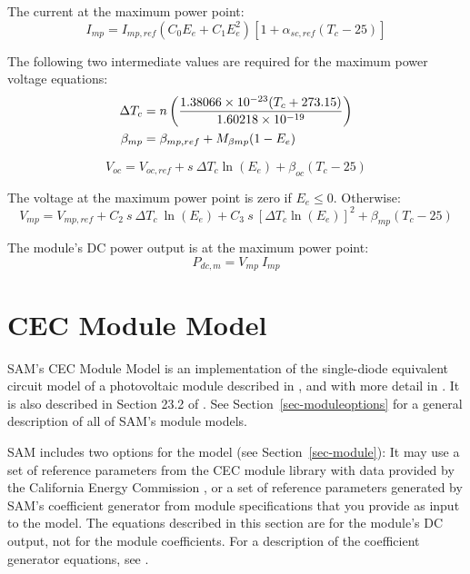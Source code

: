 \documentclass[12pt,letterpaper]{article}
\begin{document}
The current at the maximum power point:
\begin{equation}
I_{mp} = I_{mp,ref} (C_0 E_e + C_1 E_e^2) \left[1 + \alpha_{sc,ref} (T_c - 25)\right]
\end{equation}

The following two intermediate values are required for the maximum power voltage equations:
\begin{align}
\Delta T_c &= n \left(\frac{1.38066\times10^{-23} (T_c + 273.15)}{1.60218\times10^{-19}}\right) \notag\\
\beta_{mp} & = \beta_{mp,ref} + M_{\beta mp} (1 - E_e)
\end{align}

\begin{equation}
V_{oc} = V_{oc,ref}+ s~\Delta T_c \ln(E_e)+ \beta_{oc} (T_c - 25)
\end{equation}

The voltage at the maximum power point is zero if $E_e \leq 0$. Otherwise:
\begin{equation}
V_{mp} = V_{mp,ref} +
 C_2~s~\Delta T_c~\ln(E_e) +
 C_3~s~\left[\Delta T_c \ln(E_e)\right]^2 +
 \beta_{mp} (T_c - 25)
\end{equation}

The module's DC power output is at the maximum power point:
\begin{equation}
P_{dc,m} = V_{mp}~I_{mp}
\end{equation}

\section{CEC Module Model}\label{sec-cecmodule}

SAM's CEC Module Model is an implementation of the single-diode equivalent circuit model of a photovoltaic module described in \citet{desoto2004a}, and with more detail in \citet{desoto2004b}. It is also described in Section 23.2 of  \citet{duffie2013}. See Section~\ref{sec-moduleoptions} for a general description of all of SAM's module models.

SAM includes two options for the model (see Section~\ref{sec-module}): It may use a set of reference parameters from the CEC module library with data provided by the California Energy Commission \citep{gsc2014a}, or a set of reference parameters generated by SAM's coefficient generator from module specifications that you provide as input to the model. The equations described in this section are for the module's DC output, not for the module coefficients. For a description of the coefficient generator equations, see \citet{dobos2012a}. 
\end{document}
